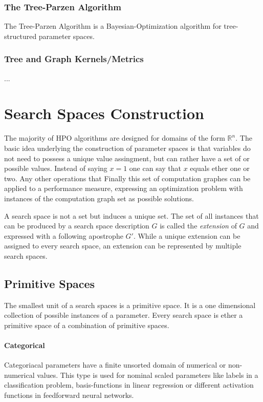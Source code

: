 \documentclass[english]{article}
\begin{document}
\subsubsection{The Tree-Parzen Algorithm}
The Tree-Parzen Algorithm \cite{bergstra_algorithms_2011} is a Bayesian-Optimization algorithm for tree-structured parameter spaces.

\subsubsection{Tree and Graph Kernels/Metrics}
...






\section{Search Spaces Construction}
The majority of \ac{HPO} algorithms are designed for domains of the form $\mathbb{R}^n$.
The basic idea underlying the construction of parameter spaces is that variables do not need to possess a unique value assingment, but can rather have a set of or possible values. Instead of saying $x = 1$ one can say that $x$ equals ether one or two. Any other operations that Finally this set of computation graphes can be applied to a performance measure, expressing an optimization problem with instances of the computation graph set as possible solutions.

A search space is not a set but induces a unique set. The set of all instances that can be produced by a search space description $G$ is called the \textit{extension} of $G$ and expressed with a following apostrophe $G'$. While a unique extension can be assigned to every search space, an extension can be represented by multiple search spaces.

\subsection{Primitive Spaces}
The smallest unit of a search spaces is a primitive space. It is a one dimensional collection of possible instances of a parameter. Every search space is ether a primitive space of a combination of primitive spaces.

\paragraph{Categorical}
Categoriacal parameters have a finite unsorted domain of numerical or non-numerical values. This type is used for nominal scaled parameters like labels in a classification problem, basis-functions in linear regression or different activation functions in feedforward neural networks.
\end{document}
